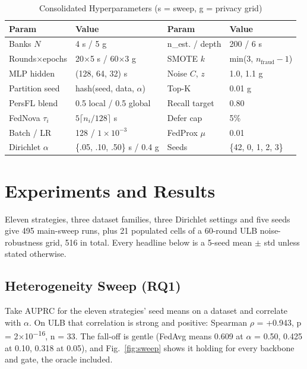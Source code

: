 \documentclass[a4paper, 10pt, conference]{ieeeconf}
\begin{document}
\begin{table}[!tb]
\caption{Consolidated Hyperparameters (s = sweep, g = privacy grid)}\label{tab:hyper}
\centering\scriptsize
\setlength{\tabcolsep}{3pt}
\begin{tabular}{@{}ll|ll@{}}
\hline
\textbf{Param} & \textbf{Value} & \textbf{Param} & \textbf{Value} \\ \hline
Banks $N$ & 4 s / 5 g & n\_est. / depth & 200 / 6 s \\
Rounds$\times$epochs & 20$\times$5 s / 60$\times$3 g & SMOTE $k$ & min(3, $n_{\mathrm{fraud}}{-}1$) \\
MLP hidden & (128, 64, 32) s & Noise $C$, $z$ & 1.0, 1.1 g \\
Partition seed & hash(seed, data, $\alpha$) & Top-K & 0.01 g \\
PersFL blend & 0.5 local / 0.5 global & Recall target & 0.80 \\
FedNova $\tau_i$ & $5\lceil n_i/128 \rceil$ s & Defer cap & 5\% \\
Batch / LR & 128 / $1{\times}10^{-3}$ & FedProx $\mu$ & 0.01 \\
Dirichlet $\alpha$ & \{.05, .10, .50\} s / 0.4 g & Seeds & \{42, 0, 1, 2, 3\} \\ \hline
\end{tabular}
\end{table}

\section{Experiments and Results}

Eleven strategies, three dataset families, three Dirichlet settings and five
seeds give 495 main-sweep runs, plus 21 populated cells of a 60-round ULB
noise-robustness grid, 516 in total. Every headline below is a 5-seed mean
$\pm$ std unless stated otherwise.

\subsection{Heterogeneity Sweep (RQ1)}
Take AUPRC for the eleven strategies' seed means on a dataset and correlate with
$\alpha$. On ULB that correlation is strong and positive: Spearman $\rho$ =
+0.943, p = 2$\times$10\textsuperscript{$-$16}, n = 33. The fall-off is gentle
(FedAvg means 0.609 at $\alpha$ = 0.50, 0.425 at 0.10, 0.318 at 0.05), and
Fig.~\ref{fig:sweep} shows it holding for every backbone and gate, the oracle
included.
\end{document}

